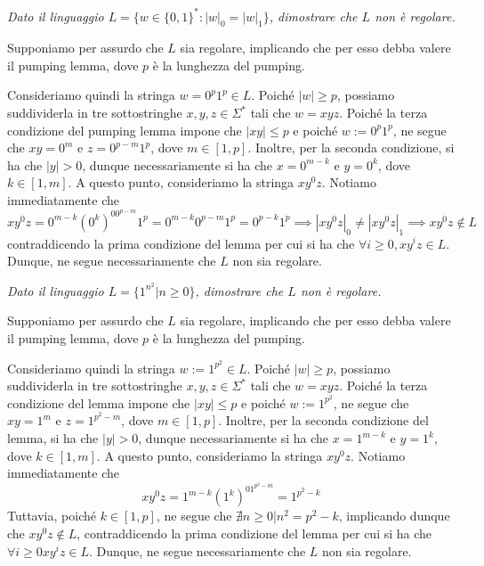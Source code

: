 \begin{Exercise}{}{}
\textit{Dato il linguaggio $L = \{w\in \{0, 1\}^*: |w|_0 = |w|_1\}$, dimostrare che $L$ non è regolare.}

\begin{demonstration}
Supponiamo per assurdo che $L$ sia regolare, implicando che per esso debba valere il
pumping lemma, dove $p$ è la lunghezza del pumping. 

Consideriamo quindi la stringa $w = 0^p1^p\in L$. Poiché $|w|\geq p$, possiamo suddividerla in tre sottostringhe $x, y, z\in\Sigma^*$ tali che $w = xyz$. Poiché la terza condizione del pumping lemma impone che $|xy|\leq p$ e poiché $w := 0^p1^p$, ne segue che $xy = 0^m$ e $z = 0^{p-m}1^p$, dove $m\in [1, p]$. Inoltre, per la seconda condizione, si ha che $|y| > 0$, dunque necessariamente si ha che $x = 0^{m-k}$ e $y = 0^k$, dove $k\in [1, m]$. A questo punto, consideriamo la stringa $xy^0z$. Notiamo immediatamente che 
\begin{equation*}
xy^0z = 0^{m-k}(0^k)^00^{p-m}1^p = 0^{m-k}0^{p-m}1^p = 0^{p-k}1^p\implies |xy^0z|_0\neq|xy^0z|_1\implies xy^0z\notin L    
\end{equation*}
contraddicendo la prima condizione del lemma per cui si ha che $\forall i\geq0, xy^iz\in L$. Dunque, ne segue necessariamente che $L$ non sia regolare.
\end{demonstration}
\end{Exercise}

\begin{Exercise}{}{}
\textit{Dato il linguaggio $L = \{1^{n^2}| n\geq0\}$, dimostrare che $L$ non è regolare.}

\begin{demonstration}
Supponiamo per assurdo che $L$ sia regolare, implicando che per esso debba valere il
pumping lemma, dove $p$ è la lunghezza del pumping. 

Consideriamo quindi la stringa $w := 1^{p^2}\in L$. Poiché $|w|\geq p$, possiamo suddividerla in tre sottostringhe $x, y, z\in\Sigma^*$ tali che $w = xyz$. Poiché la terza condizione del lemma impone che $|xy| \leq p$ e poiché $w := 1^{p^2}$, ne segue che $xy = 1^m$ e $z = 1^{p^2-m}$, dove $m\in [1, p]$. Inoltre, per la seconda condizione del lemma, si ha che $|y| > 0$, dunque necessariamente si ha che $x = 1^{m-k}$ e $y = 1^k$, dove $k\in [1, m]$. A questo punto, consideriamo la stringa $xy^0z$. Notiamo immediatamente che 
\begin{equation*}
xy^0z = 1^{m-k}(1^k)^01^{p^2-m} = 1^{p^2-k}   
\end{equation*}
Tuttavia, poiché $k\in [1, p]$, ne segue che $\nexists n \geq0| n^2 = p^2 - k$, implicando dunque che $xy^0z\notin L$, contraddicendo la prima condizione del lemma per cui si ha che $\forall i \geq0xy^iz\in L$. Dunque, ne segue necessariamente che $L$ non sia regolare.
\end{demonstration}
\end{Exercise}